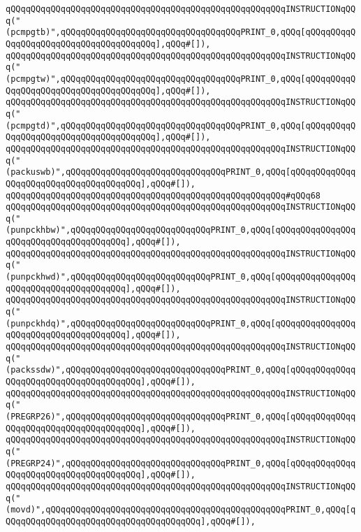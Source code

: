 \verb|qQQqqQQqqQQqqQQqqQQqqQQqqQQqqQQqqQQqqQQqqQQqqQQqqQQqqQQqINSTRUCTIONqQQq("(pcmpgtb)",qQQqqQQqqQQqqQQqqQQqqQQqqQQqqQQqqQQqPRINT_0,qQQq[qQQqqQQqqQQqqQQqqQQqqQQqqQQqqQQqqQQqqQQq],qQQq#[]),|\newline
\verb|qQQqqQQqqQQqqQQqqQQqqQQqqQQqqQQqqQQqqQQqqQQqqQQqqQQqqQQqINSTRUCTIONqQQq("(pcmpgtw)",qQQqqQQqqQQqqQQqqQQqqQQqqQQqqQQqqQQqPRINT_0,qQQq[qQQqqQQqqQQqqQQqqQQqqQQqqQQqqQQqqQQqqQQq],qQQq#[]),|\newline
\verb|qQQqqQQqqQQqqQQqqQQqqQQqqQQqqQQqqQQqqQQqqQQqqQQqqQQqqQQqINSTRUCTIONqQQq("(pcmpgtd)",qQQqqQQqqQQqqQQqqQQqqQQqqQQqqQQqqQQqPRINT_0,qQQq[qQQqqQQqqQQqqQQqqQQqqQQqqQQqqQQqqQQqqQQq],qQQq#[]),|\newline
\verb|qQQqqQQqqQQqqQQqqQQqqQQqqQQqqQQqqQQqqQQqqQQqqQQqqQQqqQQqINSTRUCTIONqQQq("(packuswb)",qQQqqQQqqQQqqQQqqQQqqQQqqQQqqQQqPRINT_0,qQQq[qQQqqQQqqQQqqQQqqQQqqQQqqQQqqQQqqQQqqQQq],qQQq#[]),|\newline
\verb|qQQqqQQqqQQqqQQqqQQqqQQqqQQqqQQqqQQqqQQqqQQqqQQqqQQqqQQq#qQQq68|\newline
\verb|qQQqqQQqqQQqqQQqqQQqqQQqqQQqqQQqqQQqqQQqqQQqqQQqqQQqqQQqINSTRUCTIONqQQq("(punpckhbw)",qQQqqQQqqQQqqQQqqQQqqQQqqQQqPRINT_0,qQQq[qQQqqQQqqQQqqQQqqQQqqQQqqQQqqQQqqQQqqQQq],qQQq#[]),|\newline
\verb|qQQqqQQqqQQqqQQqqQQqqQQqqQQqqQQqqQQqqQQqqQQqqQQqqQQqqQQqINSTRUCTIONqQQq("(punpckhwd)",qQQqqQQqqQQqqQQqqQQqqQQqqQQqPRINT_0,qQQq[qQQqqQQqqQQqqQQqqQQqqQQqqQQqqQQqqQQqqQQq],qQQq#[]),|\newline
\verb|qQQqqQQqqQQqqQQqqQQqqQQqqQQqqQQqqQQqqQQqqQQqqQQqqQQqqQQqINSTRUCTIONqQQq("(punpckhdq)",qQQqqQQqqQQqqQQqqQQqqQQqqQQqPRINT_0,qQQq[qQQqqQQqqQQqqQQqqQQqqQQqqQQqqQQqqQQqqQQq],qQQq#[]),|\newline
\verb|qQQqqQQqqQQqqQQqqQQqqQQqqQQqqQQqqQQqqQQqqQQqqQQqqQQqqQQqINSTRUCTIONqQQq("(packssdw)",qQQqqQQqqQQqqQQqqQQqqQQqqQQqqQQqPRINT_0,qQQq[qQQqqQQqqQQqqQQqqQQqqQQqqQQqqQQqqQQqqQQq],qQQq#[]),|\newline
\verb|qQQqqQQqqQQqqQQqqQQqqQQqqQQqqQQqqQQqqQQqqQQqqQQqqQQqqQQqINSTRUCTIONqQQq("(PREGRP26)",qQQqqQQqqQQqqQQqqQQqqQQqqQQqqQQqPRINT_0,qQQq[qQQqqQQqqQQqqQQqqQQqqQQqqQQqqQQqqQQqqQQq],qQQq#[]),|\newline
\verb|qQQqqQQqqQQqqQQqqQQqqQQqqQQqqQQqqQQqqQQqqQQqqQQqqQQqqQQqINSTRUCTIONqQQq("(PREGRP24)",qQQqqQQqqQQqqQQqqQQqqQQqqQQqqQQqPRINT_0,qQQq[qQQqqQQqqQQqqQQqqQQqqQQqqQQqqQQqqQQqqQQq],qQQq#[]),|\newline
\verb|qQQqqQQqqQQqqQQqqQQqqQQqqQQqqQQqqQQqqQQqqQQqqQQqqQQqqQQqINSTRUCTIONqQQq("(movd)",qQQqqQQqqQQqqQQqqQQqqQQqqQQqqQQqqQQqqQQqqQQqqQQqPRINT_0,qQQq[qQQqqQQqqQQqqQQqqQQqqQQqqQQqqQQqqQQqqQQq],qQQq#[]),|\newline
